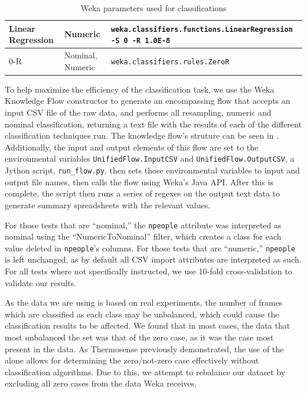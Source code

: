 \documentclass[../thesis/thesis.tex]{subfiles}
\begin{document}
\begin{table}[h]
\begin{tabular}{|p{40mm}|p{20mm}|p{70mm}|}
Linear Regression & Numeric & \texttt{weka.classifiers.functions\newline.LinearRegression \newline -S 0 -R 1.0E-8} \\ \hline

0-R & Nominal, \newline Numeric & \texttt{weka.classifiers.rules.ZeroR} \\ \hline
\end{tabular}
\caption{Weka parameters used for classifications}
\label{tab:methods:params}
\end{table}

To help maximize the efficiency of the classification task, we use the Weka Knowledge Flow constructor to generate an encompassing flow that accepts an input CSV file of the raw data, and performs all resampling, numeric and nominal classification, returning a text file with the results of each of the different classification techniques run. The knowledge flow's struture can be seen in \label{fig:methods:unifiedflow}. Additionally, the input and output elements of this flow are set to the environmental variables \texttt{UnifiedFlow.InputCSV} and \texttt{UnifiedFlow.OutputCSV}, a Jython script, \texttt{run\_flow.py}, then sets those environmental variables to input and output file names, then calls the flow using Weka's Java API. After this is complete, the script then runs a series of regexes on the output text data to generate summary spreadsheets with the relevant values.

For those tests that are ``nominal,'' the \texttt{npeople} attribute was interpreted as nominal using the ``NumericToNominal'' filter, which creates a class for each value deleted in \texttt{npeople}'s columns. For those tests that are ``numeric,'' \texttt{npeople} is left unchanged, as by default all CSV import attributes are interpreted as such. For all tests where not specifically instructed, we use 10-fold cross-validation to validate our results.

As the data we are using is based on real experiments, the number of frames which are classified as each class may be unbalanced, which could cause the classification results to be affected. We found that in most cases, the data that most unbalanced the set was that of the zero case, as it was the case most present in the data. As Thermosense previously demonstrated, the use of the \pir alone allows for determining the zero/not-zero case effectively without classification algorithms. Due to this, we attempt to rebalance our dataset by excluding all zero cases from the data Weka receives.
\end{document}
